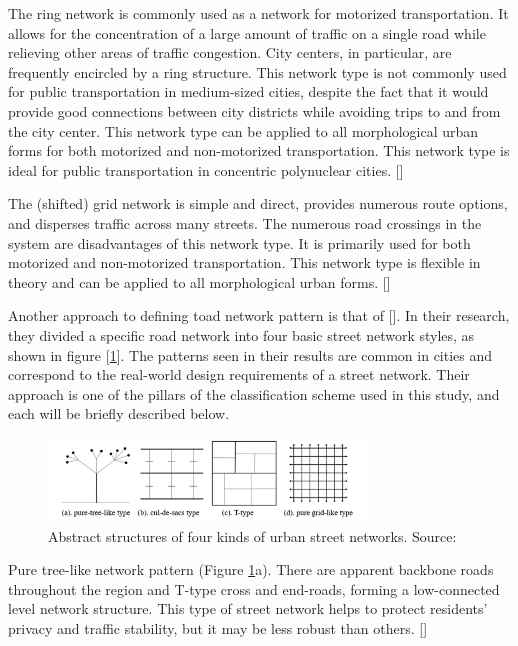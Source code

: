The ring network is commonly used as a network for motorized transportation. It allows for the concentration of a large amount of traffic on a single road while relieving other areas of traffic congestion. City centers, in particular, are frequently encircled by a ring structure. This network type is not commonly used for public transportation in medium-sized cities, despite the fact that it would provide good connections between city districts while avoiding trips to and from the city center. This network type can be applied to all morphological urban forms for both motorized and non-motorized transportation. This network type is ideal for public transportation in concentric polynuclear cities. [\cite{Snellen:2002}]

The (shifted) grid network is simple and direct, provides numerous route options, and disperses traffic across many streets. The numerous road crossings in the system are disadvantages of this network type. It is primarily used for both motorized and non-motorized transportation. This network type is flexible in theory and can be applied to all morphological urban forms. [\cite{Snellen:2002}]

Another approach to defining toad network pattern is that of [\cite{Chan:2011,Lima:2015}]. In their research, they divided a specific road network into four basic street network styles, as shown in figure [\ref{fig:transportnetworks}]. The patterns seen in their results are common in cities and correspond to the real-world design requirements of a street network. Their approach is one of the pillars of the classification scheme used in this study, and each will be briefly described below.

\begin{figure}[!ht]
\centering
\includegraphics[width=0.75\textwidth,center]{picture/Cul de.png}
\caption[Abstract Structures of Four Kinds of Urban Street Networks]{Abstract structures of four kinds of urban street networks. Source: \cite{Han:2020}}
\label{fig:transportnetworks}
\end{figure}

Pure tree-like network pattern (Figure \ref{fig:transportnetworks}a). There are apparent backbone roads throughout the region and T-type cross and end-roads, forming a low-connected level network structure. This type of street network helps to protect residents' privacy and traffic stability, but it may be less robust than others. [\cite{Chan:2011,Lima:2015,Han:2020}]

